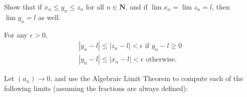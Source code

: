 \begin{exercise}
  Show that if $x_{n} \leq y_{n} \leq z_{n}$ for all $n \in \mathbf{N}$, and if $\lim x_{n}=\lim z_{n}=l$, then $\lim y_{n}=l$ as well.
\end{exercise}

\begin{solution}
  For any $\epsilon > 0$, 
  $$
  \begin{array}{l}
  |y_n - l|\leq |z_n -l|<\epsilon \text{ if } y_n-l\geq 0\\
  |y_n - l|\leq |x_n -l|<\epsilon \text{ otherwise}.
  \end{array}
  $$
\end{solution}

\begin{exercise}
  Let $\left(a_{n}\right) \rightarrow 0$, and use the Algebraic Limit Theorem to compute each of the following limits (assuming the fractions are always defined):
\end{exercise}

\begin{solution}
\end{solution}

